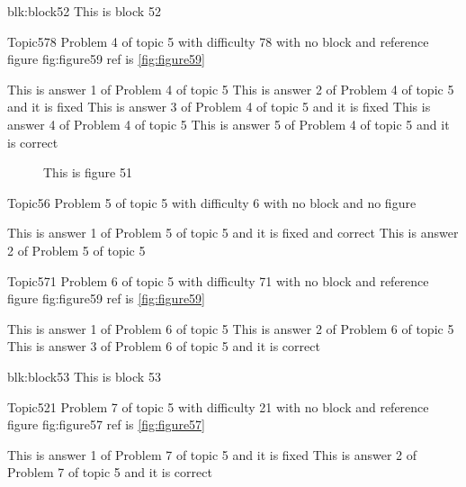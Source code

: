 \documentclass[master]{exam}
\begin{document}
\begin{block}{blk:block52}
This is block 52
\end{block}


\begin{problem}{Topic5}{78}
	Problem 4 of topic 5 with difficulty 78 with no block and reference figure fig:figure59 ref is \ref{fig:figure59}
	\begin{answers}
		\answer This is answer 1 of Problem 4 of topic 5 
		\answer[fixed] This is answer 2 of Problem 4 of topic 5 and it is fixed
		\answer[fixed] This is answer 3 of Problem 4 of topic 5 and it is fixed
		\answer This is answer 4 of Problem 4 of topic 5 
		\answer[correct] This is answer 5 of Problem 4 of topic 5 and it is correct
	\end{answers}
\end{problem}



\begin{figure}
	\begin{center}
		This is figure 51 
		\label{fig:figure51}
	\end{center}
\end{figure}

\begin{problem}{Topic5}{6}
	Problem 5 of topic 5 with difficulty 6 with no block and no figure
	\begin{answers}
		 This is answer 1 of Problem 5 of topic 5 and it is fixed and correct
		\answer This is answer 2 of Problem 5 of topic 5 
	\end{answers}
\end{problem}

\begin{problem}{Topic5}{71}
	Problem 6 of topic 5 with difficulty 71 with no block and reference figure fig:figure59 ref is \ref{fig:figure59}
	\begin{answers}
		\answer This is answer 1 of Problem 6 of topic 5 
		\answer This is answer 2 of Problem 6 of topic 5 
		\answer[correct] This is answer 3 of Problem 6 of topic 5 and it is correct
	\end{answers}
\end{problem}



\begin{block}{blk:block53}
This is block 53
\end{block}


\begin{problem}{Topic5}{21}
	Problem 7 of topic 5 with difficulty 21 with no block and reference figure fig:figure57 ref is \ref{fig:figure57}
	\begin{answers}
		\answer[fixed] This is answer 1 of Problem 7 of topic 5 and it is fixed
		\answer[correct] This is answer 2 of Problem 7 of topic 5 and it is correct
	\end{answers}
\end{problem}
\end{document}
